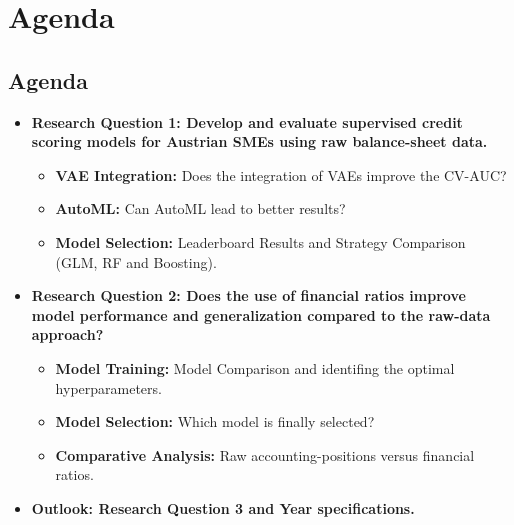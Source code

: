 \documentclass{report}\usepackage[]{graphicx}\usepackage[]{xcolor}
\begin{document}
\chapter{Agenda}

\section{Agenda}

\begin{itemize}
    \item \textbf{Research Question 1: Develop and evaluate supervised credit scoring models for
Austrian SMEs using raw balance-sheet data.}
    \begin{itemize}
        \item \textbf{VAE Integration:} Does the integration of VAEs improve the CV-AUC?
        \item \textbf{AutoML:} Can AutoML lead to better results?
        \item \textbf{Model Selection:} Leaderboard Results and Strategy Comparison (GLM, RF and Boosting).
    \end{itemize}

    \vspace{0.5cm} %

    \item \textbf{Research Question 2: Does the use of financial ratios improve model performance and 
generalization compared to the raw-data approach?}
    \begin{itemize}
        \item \textbf{Model Training:} Model Comparison and identifing the optimal hyperparameters.
        \item \textbf{Model Selection:} Which model is finally selected?
        \item \textbf{Comparative Analysis:} Raw accounting-positions versus financial ratios.
    \end{itemize}
    
    \item \textbf{Outlook: Research Question 3 and Year specifications.}

\end{itemize}





\end{document}
